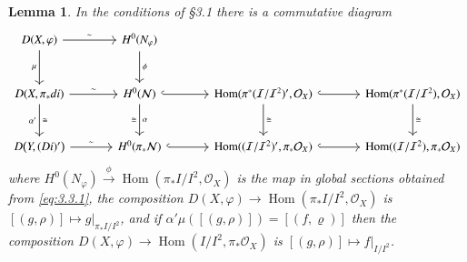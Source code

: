 \documentclass[11pt,twoside]{amsart}
\theoremstyle{plain}
\numberwithin{equation}{section}
\newtheorem{lemma}[theorem]{Lemma}
\theoremstyle{definition}
\begin{document}
\begin{lemma}\label{lem:3.4}
In the conditions of \S3.1 there is a commutative diagram
\begin{equation}\label{eq:3.4.1}
\begin{tikzcd}[column sep=large,row sep=large]
D(X,\varphi) \arrow[r,"\sim"] \arrow[d,"\mu"'] &
H^{0}(N_{\varphi}) \arrow[d,"\phi"] & & \\
D(X,\pi_{*}d i) \arrow[r,"\sim"] \arrow[d,"\alpha'"', "\cong"] &
H^0(\mathcal{N}) \arrow[d,"\alpha", "\cong"'] \arrow[r, hook] & \operatorname{Hom}(\pi^*(\mathcal{I}/\mathcal{I}^2)', \mathcal{O}_X) \arrow[d, "\cong"] \arrow[r, hook] & \operatorname{Hom}(\pi^*(\mathcal{I}/\mathcal{I}^2), \mathcal{O}_X) \arrow[d, "\cong"] \\
D\bigl(Y,(D i)'\bigr) \arrow[r,"\sim"] &
H^0(\pi_*\mathcal{N}) \arrow[r, hook] & \operatorname{Hom}((\mathcal{I}/\mathcal{I}^2)', \pi_*\mathcal{O}_X) \arrow[r, hook] & \operatorname{Hom}((\mathcal{I}/\mathcal{I}^2), \pi_*\mathcal{O}_X) 
\end{tikzcd}
\end{equation}
where \(H^{0}(N_{\varphi}) \xrightarrow{\ \phi\ }
\operatorname{Hom}(\pi_{*}I/I^{2},\mathcal O_{X})\) is the map in global sections obtained from
\eqref{eq:3.3.1}, the composition
\(D(X,\varphi)\to \operatorname{Hom}(\pi_{*}I/I^{2},\mathcal O_{X})\) is
\([(g,\rho)] \mapsto g|_{\pi_{*}I/I^{2}}\), and if \(\alpha'\mu([(g,\rho)])=[(f,\varrho)]\)
then the composition
\(D(X,\varphi)\to \operatorname{Hom}(I/I^{2},\pi_{*}\mathcal O_{X})\) is
\([(g,\rho)] \mapsto f|_{I/I^{2}}\).
\end{lemma}
\end{document}
